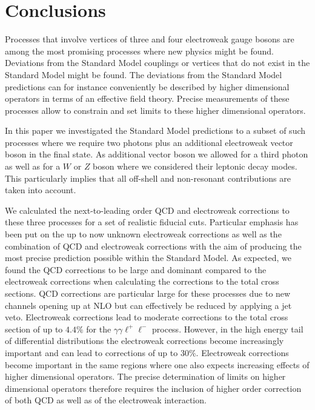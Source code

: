 \section{Conclusions}
\label{sec:conclusions}
Processes that involve vertices of three and four electroweak gauge bosons are among the most promising processes
where new physics might be found. Deviations from the Standard Model couplings or vertices that do not exist in the 
Standard Model might be found. The deviations from the Standard Model predictions can for instance conveniently be 
described by higher dimensional operators in terms of an effective field theory. Precise measurements of these  
processes allow to constrain and set limits to these higher dimensional operators.

In this paper we investigated the Standard Model predictions to a subset of such processes where we require
two photons plus an additional electroweak vector boson in the final state.  As additional vector boson we allowed
for a third photon as well as for a $W$ or $Z$ boson where we considered their leptonic decay modes.
This particularly implies that all off-shell and non-resonant contributions are taken into account.

We calculated the next-to-leading order QCD and electroweak corrections to these three processes for a set
of realistic fiducial cuts. Particular
emphasis has been put on the up to now unknown electroweak corrections as well as the combination of QCD and
electroweak corrections with the aim of producing the most precise prediction possible within the Standard Model.
As expected, we found the QCD corrections to be large and dominant compared to the electroweak corrections when 
calculating the corrections to the total cross sections. QCD corrections are particular large for these processes due to new
channels opening up at NLO but can effectively be reduced by applying a jet veto. Electroweak corrections
lead to moderate corrections to the total cross section of up to $4.4\%$ for the $\gamma\gamma \ell^{+}\ell^{-}$ 
process. However, in the high energy tail of differential distributions the electroweak corrections become increasingly important
and can lead to corrections of up to $30 \%$. Electroweak corrections become important in the same regions where one
also expects increasing effects of higher dimensional operators. The precise determination of limits on higher dimensional 
operators therefore requires the inclusion of higher order correction of both QCD as well as of the electroweak interaction.



